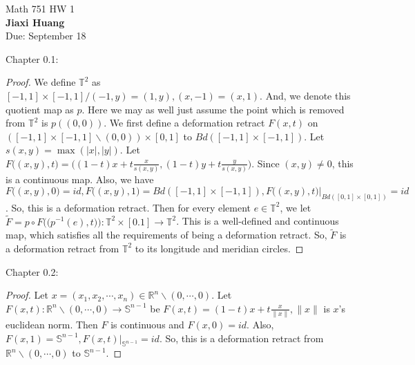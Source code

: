 \documentclass[]{book}
\theoremstyle{definition}
\begin{document}
\begin{center}
{\Large Math 751 \hspace{0.5cm} HW 1}\\
\textbf{Jiaxi Huang}\\ %
Due: September 18 %
\end{center}

\vspace{0.2 cm}






Chapter 0.1:
\begin{proof}
    We define $\mathbb{T}^2$ as $[-1,1]\times[-1,1]/(-1,y)=(1,y),(x,-1)=(x,1)$. And, we denote this quotient map as $p$. Here we may as well just assume the point which is removed from $\mathbb{T}^2$ is $p((0,0))$. We first define a deformation retract $F(x,t)$ on $([-1,1]\times[-1,1] \backslash (0,0))\times[0,1] $ to $Bd([-1,1]\times[-1,1])$. Let $s(x,y)= \max(\vert x\vert , \vert y\vert )$. Let $F\big((x,y),t\big)= \bigg( (1-t)x+t\frac{x}{s(x,y)}, (1-t)y+t\frac{y}{s(x,y)}  \bigg)  $. Since $(x,y) \neq 0$, this is a continuous map. Also, we have $F\big(  (x,y),0  \big)= id, F\big(  (x,y),1  \big)= Bd([-1,1]\times[-1,1]), F\big(  (x,y),t  \big)\vert_{Bd([0,1]\times[0,1])}=id $. So, this is a deformation retract. Then  for every element $e \in \mathbb{T}^2$, we let $\tilde{F}= p \circ F\bigg(  \big(  p^{-1}(e), t   \big)  \bigg): \mathbb{T}^2\times[0.1] \to \mathbb{T}^2$. This is a well-defined and continuous map, which satisfies all the requirements of being a deformation retract. So, $\tilde{F}$ is a deformation retract from $\mathbb{T}^2$ to its longitude and meridian circles.
\end{proof}

Chapter 0.2:
\begin{proof}
Let $x= (x_1, x_2, \cdots, x_n)\in \mathbb{R}^n\backslash(0,\cdots,0)$. Let $F(x,t): \mathbb{R}^n\backslash(0,\cdots,0) \to \mathbb{S}^{n-1} $ be $F(x,t)= (1-t)x+t\frac{x}{\| x\|}, \|x\|$ is $x$'s euclidean norm. Then $F$ is continuous and $F(x,0)=id$. Also, $F(x,1)=\mathbb{S}^{n-1}, F(x,t)\vert_{\mathbb{S}^{n-1}}= id $. So, this is a deformation retract from $\mathbb{R}^n\backslash(0,\cdots,0)$ to $\mathbb{S}^{n-1}$.
\end{proof}
\end{document}
